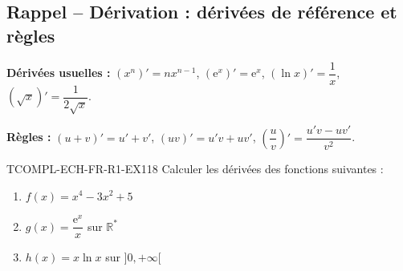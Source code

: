 

\subsection*{Rappel -- Dérivation : dérivées de référence et règles}

\textbf{Dérivées usuelles :} $(x^n)' = n x^{n-1}$, $(\mathrm{e}^x)' = \mathrm{e}^x$, $(\ln x)' = \dfrac{1}{x}$, $(\sqrt{x})' = \dfrac{1}{2\sqrt{x}}$.

\textbf{Règles :} $(u+v)' = u' + v'$, $(uv)' = u'v + uv'$, $\left(\dfrac{u}{v}\right)' = \dfrac{u'v - uv'}{v^2}$.

\begin{exercice}{TCOMPL-ECH-FR-R1-EX1}{1}{8}
Calculer les dérivées des fonctions suivantes :
\begin{enumerate}
  \item $f(x) = x^4 - 3x^2 + 5$
  \item $g(x) = \dfrac{\mathrm{e}^x}{x}$ sur $\mathbb{R}^*$
  \item $h(x) = x \ln x$ sur $]0, +\infty[$
\end{enumerate}
\end{exercice}

